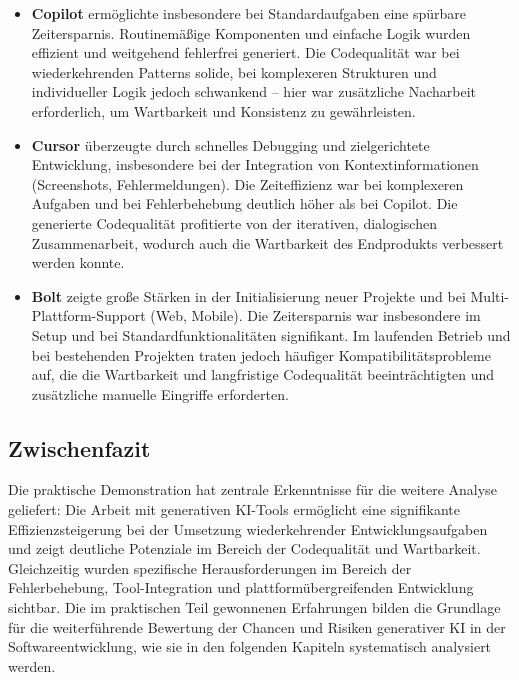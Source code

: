 \begin{itemize}
    \item \textbf{Copilot} ermöglichte insbesondere bei Standardaufgaben eine spürbare Zeitersparnis. Routinemäßige Komponenten und einfache Logik wurden effizient und weitgehend fehlerfrei generiert. Die Codequalität war bei wiederkehrenden Patterns solide, bei komplexeren Strukturen und individueller Logik jedoch schwankend – hier war zusätzliche Nacharbeit erforderlich, um Wartbarkeit und Konsistenz zu gewährleisten.
    \item \textbf{Cursor} überzeugte durch schnelles Debugging und zielgerichtete Entwicklung, insbesondere bei der Integration von Kontextinformationen (Screenshots, Fehlermeldungen). Die Zeiteffizienz war bei komplexeren Aufgaben und bei Fehlerbehebung deutlich höher als bei Copilot. Die generierte Codequalität profitierte von der iterativen, dialogischen Zusammenarbeit, wodurch auch die Wartbarkeit des Endprodukts verbessert werden konnte.
    \item \textbf{Bolt} zeigte große Stärken in der Initialisierung neuer Projekte und bei Multi-Plattform-Support (Web, Mobile). Die Zeitersparnis war insbesondere im Setup und bei Standardfunktionalitäten signifikant. Im laufenden Betrieb und bei bestehenden Projekten traten jedoch häufiger Kompatibilitätsprobleme auf, die die Wartbarkeit und langfristige Codequalität beeinträchtigten und zusätzliche manuelle Eingriffe erforderten.
\end{itemize}

\subsection{Zwischenfazit}

Die praktische Demonstration hat zentrale Erkenntnisse für die weitere Analyse
geliefert: Die Arbeit mit generativen KI-Tools ermöglicht eine signifikante
Effizienzsteigerung bei der Umsetzung wiederkehrender Entwicklungsaufgaben und
zeigt deutliche Potenziale im Bereich der Codequalität und Wartbarkeit.
Gleichzeitig wurden spezifische Herausforderungen im Bereich der
Fehlerbehebung, Tool-Integration und plattformübergreifenden Entwicklung
sichtbar. Die im praktischen Teil gewonnenen Erfahrungen bilden die Grundlage
für die weiterführende Bewertung der Chancen und Risiken generativer KI in der
Softwareentwicklung, wie sie in den folgenden Kapiteln systematisch analysiert
werden.


